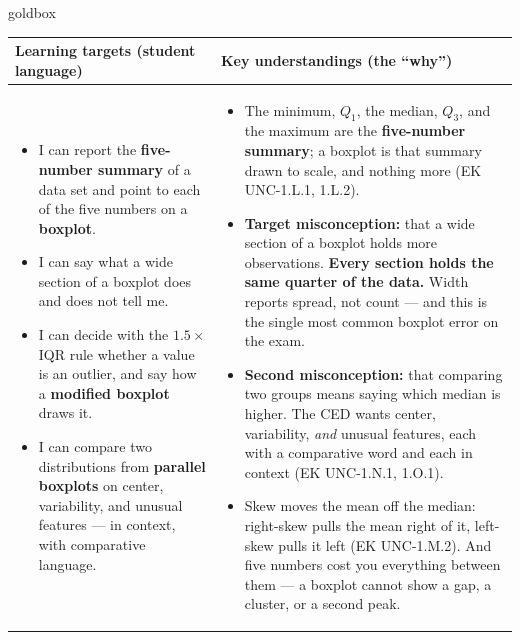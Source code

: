 \documentclass[10pt]{article}
\begin{document}
\renewcommand{\arraystretch}{1.4}
\boxguard
\begin{skillbox}{goldbox}
\begin{tabularx}{\linewidth}{@{}X|X@{}}
\textbf{Learning targets (student language)} & \textbf{Key understandings (the ``why'')} \\[2pt]
\hline
\vspace{-6pt}
\begin{itemize}[leftmargin=1.1em, nosep, after=\vspace{2pt}]
  \item I can report the \textbf{five-number summary} of a data set and point to each of the
        five numbers on a \textbf{boxplot}.
  \item I can say what a wide section of a boxplot does and does not tell me.
  \item I can decide with the $1.5\times$IQR rule whether a value is an outlier, and say how a
        \textbf{modified boxplot} draws it.
  \item I can compare two distributions from \textbf{parallel boxplots} on center, variability,
        and unusual features --- in context, with comparative language.
\end{itemize}
&
\vspace{-6pt}
\begin{itemize}[leftmargin=1.1em, nosep, after=\vspace{2pt}]
  \item The minimum, $Q_1$, the median, $Q_3$, and the maximum are the \textbf{five-number
        summary}; a boxplot is that summary drawn to scale, and nothing more (EK UNC-1.L.1,
        1.L.2).
  \item \textbf{Target misconception:} that a wide section of a boxplot holds more
        observations. \textbf{Every section holds the same quarter of the data.} Width reports
        spread, not count --- and this is the single most common boxplot error on the exam.
  \item \textbf{Second misconception:} that comparing two groups means saying which median is
        higher. The CED wants center, variability, \emph{and} unusual features, each with a
        comparative word and each in context (EK UNC-1.N.1, 1.O.1).
  \item Skew moves the mean off the median: right-skew pulls the mean right of it, left-skew
        pulls it left (EK UNC-1.M.2). And five numbers cost you everything between them --- a
        boxplot cannot show a gap, a cluster, or a second peak.
\end{itemize}
\end{tabularx}
\end{skillbox}
\end{document}
